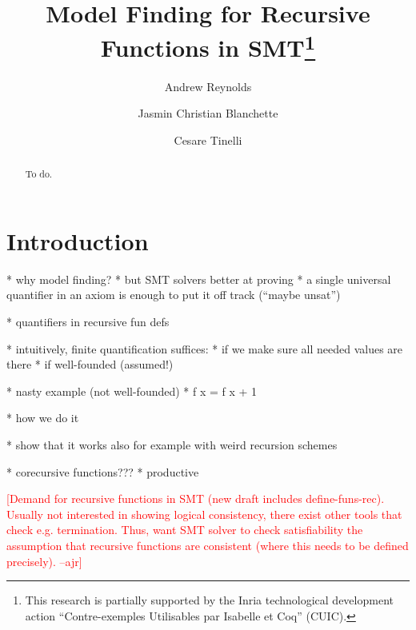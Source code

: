 \documentclass[runningheads,a4paper]{llncs}
\newcommand{\rem}[1]{\textcolor{red}{[#1]}}
\newcommand{\ajr}[1]{\rem{#1 --ajr}}
\begin{document}
\title{Model Finding for Recursive Functions in SMT\thanks{%
This research is partially supported by the Inria technological development
action ``Contre-exemples Utilisables par Isabelle et Coq'' (CUIC).
}
}

\author {Andrew Reynolds \and Jasmin Christian Blanchette \and Cesare Tinelli }

\maketitle

\begin{abstract}
To do.
\end{abstract}

\section{Introduction}
\label{sec:introduction}

  * why model finding?
  * but SMT solvers better at proving
    * a single universal quantifier in an axiom is enough to put it off track
      (``maybe unsat'')

  * quantifiers in recursive fun defs

  * intuitively, finite quantification suffices:
    * if we make sure all needed values are there
    * if well-founded (assumed!)

  * nasty example (not well-founded)
    * f x = f x + 1

  * how we do it

  * show that it works also for example with weird recursion schemes

  * corecursive functions???
    * productive


\ajr{Demand for recursive functions in SMT (new draft includes define-funs-rec).  Usually not interested in showing logical consistency, there exist other tools that check e.g. termination. 
Thus, want SMT solver to check satisfiability the assumption that recursive functions are consistent (where this needs to be defined precisely).
}
\end{document}
